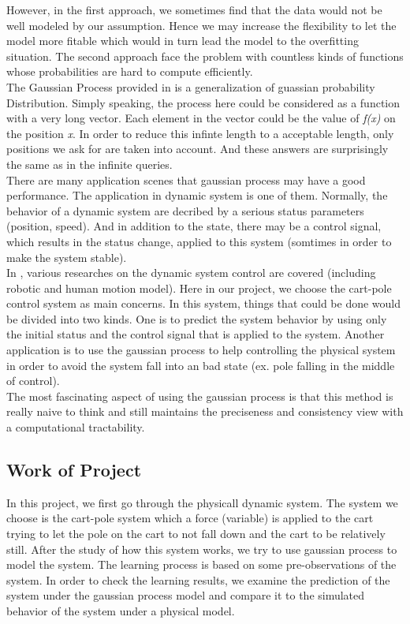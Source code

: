 \documentclass[11pt,twoside,a4paper]{article}
\begin{document}
However, in the first approach, we sometimes find that the data would
not be well modeled by our assumption. Hence we may increase the
flexibility to let the model more fitable which would in turn lead the
model to the overfitting situation. The second approach face the
problem with countless kinds of functions whose probabilities are hard to
compute efficiently.\\

The Gaussian Process provided in \cite{Doob1944} is a generalization
of guassian probability Distribution. Simply speaking, the process
here could be considered as a function with a very long vector. Each
element in the vector could be the value of \textit{f(x)} on the
position \textit{x}. In order to reduce this infinte length to a
acceptable length, only positions we ask for are taken into
account. And these answers are surprisingly the same as in the
infinite queries.\\

There are many application scenes that gaussian process may have a
good performance. The application in dynamic system is one of
them. Normally, the behavior of a dynamic system are decribed by a
serious status parameters (position, speed). And in addition to the
state, there may be a control signal, which results in the status
change, applied to this system (somtimes in order to make the system
stable).\\

In \cite{Kocijan2003, Nguyen-Tuong2008, Azman2008},
various researches on the dynamic system control are covered (including robotic
and human motion model). Here in our project, we choose the cart-pole
control system \cite{Brownlee2005} as main concerns. In this system,
things that could be done would be divided into two kinds. One is to predict the system behavior by using only the
initial status and the control signal that is applied to the system. Another
application is to use the gaussian process to help controlling
the physical system in order to avoid the system fall into an bad state
(ex. pole falling in the middle of control).\\

The most fascinating aspect of using the gaussian process is that this
method is really naive to think and still maintains the preciseness
and consistency view with a computational tractability.\\

\subsection{Work of Project}
In this project, we first go through the physicall dynamic
system. The system we choose is the cart-pole system which a force (variable) is
applied to the cart trying to let the pole on the cart to not fall down
and the cart to be relatively still. After the study of how this system
works, we try to use gaussian process to model the system. The
learning process is based on some pre-observations of the system. In
order to check the learning results, we examine the prediction of the
system under the gaussian process model and compare it to the simulated
behavior of the system under a physical model.\\
\end{document}
